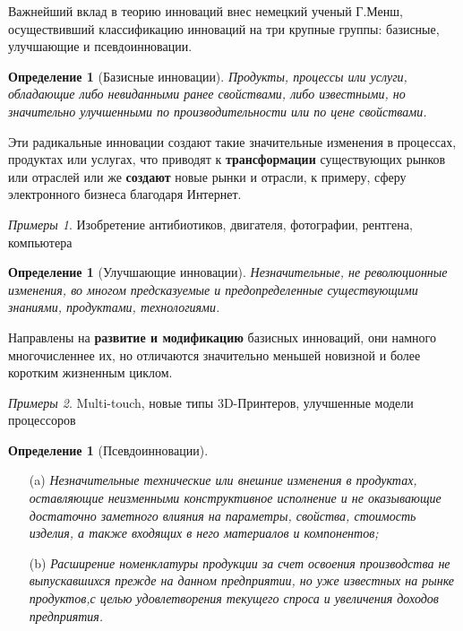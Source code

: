 \documentclass[11pt]{article}
\theoremstyle{plain} %
\newtheorem{proposition}[theorem]{Определение}
\theoremstyle{definition} %
\theoremstyle{remark} %
\newtheorem*{nonum}{Примеры}
\begin{document}
	\indent Важнейший вклад в теорию инноваций внес немецкий ученый Г.Менш,  осуществивший классификацию инноваций на три крупные группы: базисные, улучшающие и псевдоинновации.

\begin{proposition}[Базисные инновации]
	Продукты,  процессы  или  услуги, обладающие либо невиданными ранее свойствами, либо известными, но значительно улучшенными по производительности или по цене свойствами.
\end{proposition}

Эти радикальные инновации создают такие значительные    изменения    в процессах, продуктах или услугах, что приводят к {\bf трансформации} существующих рынков или отраслей или же {\bf создают} новые  рынки  и отрасли, к примеру, сферу электронного бизнеса благодаря Интернет.

\begin{nonum}
	Изобретение антибиотиков, двигателя, фотографии, рентгена, компьютера
\end{nonum}

\vspace*{2.5em}

\begin{proposition}[Улучшающие  инновации]
	Незначительные,   не революционные  изменения,  во  многом  предсказуемые  и  предопределенные существующими знаниями, продуктами, технологиями.
\end{proposition}

Направлены  на  {\bf развитие и модификацию} базисных  инноваций,  они  намного многочисленнее  их,  но  отличаются значительно  меньшей  новизной  и  более  коротким  жизненным  циклом.

\begin{nonum}
	Multi-touch, новые типы 3D-Принтеров, улучшенные модели процессоров
\end{nonum}

\vspace*{2.5em}

\begin{proposition}[Псевдоинновации]
\end{proposition}

\begin{itemize}
		\item[(a)]
		{\it Незначительные технические или внешние изменения в продуктах, оставляющие  неизменными  конструктивное  исполнение  и  не  оказывающие достаточно  заметного  влияния  на  параметры,  свойства,  стоимость  изделия,  а также входящих в него материалов и компонентов;}
		\item[(b)]
		{\it Расширение   номенклатуры   продукции   за   счет   освоения производства  не  выпускавшихся  прежде  на  данном  предприятии,  но уже известных  на  рынке  продуктов,с  целью  удовлетворения  текущего  спроса  и увеличения доходов предприятия.}
\end{itemize}
\end{document}
